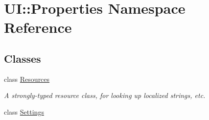 \hypertarget{namespace_u_i_1_1_properties}{
\section{UI::Properties Namespace Reference}
\label{namespace_u_i_1_1_properties}
}
\subsection*{Classes}
\begin{DoxyCompactItemize}
\item 
class \hyperlink{class_u_i_1_1_properties_1_1_resources}{Resources}
\begin{DoxyCompactList}\small\item\em A strongly-\/typed resource class, for looking up localized strings, etc. \item\end{DoxyCompactList}\item 
class \hyperlink{class_u_i_1_1_properties_1_1_settings}{Settings}
\end{DoxyCompactItemize}
